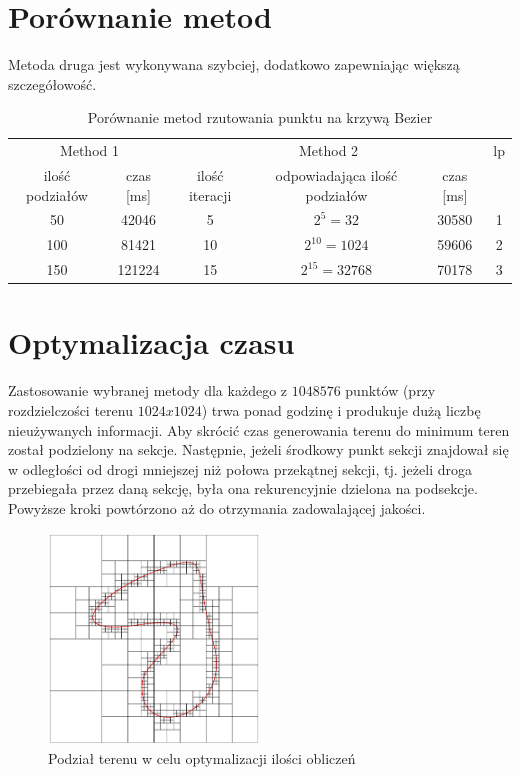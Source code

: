 \section{Porównanie metod}
Metoda druga jest wykonywana szybciej, dodatkowo zapewniając większą szczegółowość.
\begin{table}[h]
    \centering
    \begin{tabular}{|c|c|c|c|c|c|}
        \hline
        \multicolumn{2}{|c|}{Method 1} & \multicolumn{3}{c|}{Method 2} & lp\\
        ilość podziałów & czas [ms] & ilość iteracji & odpowiadająca ilość podziałów & czas [ms] & \\
        \hline
        \hline
        50 & 42046 & 5 & $2^{5}=32$ & 30580 & 1 \\
        100 & 81421 & 10 & $2^{10}=1024$ & 59606 & 2 \\
        150 & 121224 & 15 & $2^{15}=32768$ & 70178 & 3 \\
        \hline
    \end{tabular}
    \caption{Porównanie metod rzutowania punktu na krzywą Bezier}
    \label{table}
\end{table}
\clearpage

\section{Optymalizacja czasu}
Zastosowanie wybranej metody dla każdego z $1048576$ punktów (przy rozdzielczości terenu $1024 x 1024$) trwa ponad godzinę i produkuje dużą liczbę nieużywanych informacji. Aby skrócić czas generowania terenu do minimum teren został podzielony na sekcje. Następnie, jeżeli środkowy punkt sekcji znajdował się w odległości od drogi mniejszej niż połowa przekątnej sekcji, tj. jeżeli droga przebiegała przez daną sekcję, była ona rekurencyjnie dzielona na podsekcje. Powyższe kroki powtórzono aż do otrzymania zadowalającej jakości.
\begin{figure}[h]
    \centering
    \includegraphics[width=0.5\textwidth]{figures/terrain_subdivision_for_road}
    \caption{Podział terenu w celu optymalizacji ilości obliczeń}
    \label{fig}
\end{figure}

